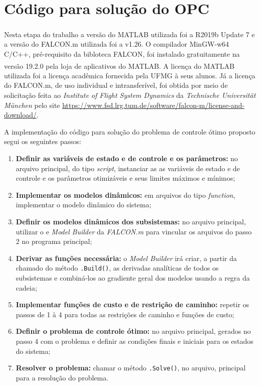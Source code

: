 \section{Código para solução do OPC}
\label{sec:metodologia_codigos}

Nesta etapa do trabalho a versão do MATLAB\textsuperscript{\textregistered} utilizada foi a R2019b Update 7 e a versão do FALCON.m utilizada foi a v1.26.
O compilador MinGW-w64 C/C++, pré-requisito da bibloteca FALCON, foi instalado gratuitamente na versão 19.2.0 pela loja de aplicativos do MATLAB\textsuperscript{\textregistered}. 
A licença do MATLAB\textsuperscript{\textregistered} utilizada foi a licença acadêmica fornecida pela UFMG à seus alunos. Já a licença do FALCON.m, de uso individual e intransferível,
foi obtida por meio de solicitação feita ao \textit{Institute of Flight System Dynamics} da \textit{Technische Universit{\"a}t M{\"u}nchen} pelo site \url{https://www.fsd.lrg.tum.de/software/falcon-m/license-and-download/}.

A implementação do código para solução do problema de controle ótimo proposto segui os seguintes passos:

\begin{enumerate}
    \item \textbf{Definir as variáveis de estado e de controle e os parâmetros:} no arquivo principal, do tipo \textit{script}, instanciar as  as variáveis de estado e de controle e os parâmetros otimizáveis e seus limites máximos e mínimos;
    \item \textbf{Implementar os modelos dinâmicos:} em arquivos do tipo \textit{function}, implementar o modelo dinâmico do sistema; 
    \item \textbf{Definir os modelos dinâmicos dos subsistemas:} no arquivo principal, utilizar o e \textit{Model Builder} da \textit{FALCON.m} para vincular os arquivos do passo 2 no programa principal;
    \item \textbf{Derivar as funções necessária:} o \textit{Model Builder} irá criar, a partir da chamado do método \lstinline[style=Matlab-editor]{.Build()}, as derivadas analíticas de todos os subsistemas e combiná-los ao gradiente geral dos modelos usando a regra da cadeia;
    \item \textbf{Implementar funções de custo e de restrição de caminho:} repetir os passos de 1 à 4 para todas as restrições de caminho e funções de custo;
    \item \textbf{Definir o problema de controle ótimo:}  no arquivo principal, gerados no passo 4 com o problema e definir as condições finais e iniciais para os estados do sistema;
    \item \textbf{Resolver o problema:} chamar o método \lstinline[style=Matlab-editor]{.Solve()}, no arquivo, principal para a resolução do problema.
\end{enumerate}

